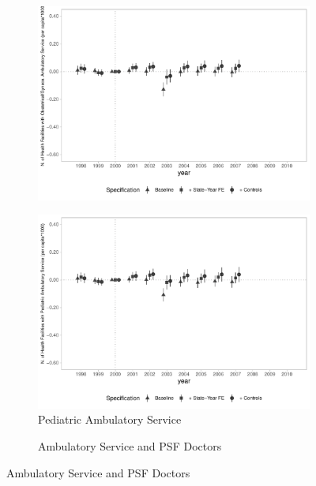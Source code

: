 \begin{figure}[h]
\begin{center}
\begin{subfigure}{0.24\textwidth}
        \includegraphics[width=\textwidth]{plots/infra/sia_ncnes_ginobs_mun_pcapita_dist_ec29_baseline_dist_ec29_baseline_full.pdf}
    \end{subfigure}
    \begin{subfigure}{0.24\textwidth}
        \centering
        \caption{\tiny Pediatric Ambulatory Service}\label{fig:infra_j}
        \includegraphics[width=\textwidth]{plots/infra/sia_ncnes_pediat_mun_pcapita_dist_ec29_baseline_dist_ec29_baseline_full.pdf}
    \end{subfigure}
    \begin{subfigure}{0.24\textwidth}
        \centering
        \caption{\tiny Ambulatory Service and PSF Doctors}\label{fig:infra_k}

\end{subfigure}
\end{center}
\end{figure}
